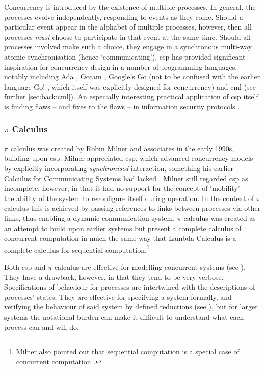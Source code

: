 Concurrency is introduced by the existence of multiple processes.  In general, the processes evolve independently, responding to events as they come.  Should a particular event appear in the alphabet of multiple processes, however, then all processes \emph{must} choose to participate in that event at the same time.  Should all processes involved make such a choice, they engage in a synchronous multi-way atomic synchronisation (hence `communicating').  \gls{csp} has provided significant inspiration for concurrency design in a number of programming languages, notably including Ada \cite{Defense1983,Taft2013}, Occam \cite{Elizabeth1987}, Google's Go \cite{Meyerson2014} (not to be confused with the earlier language Go! \cite{Clark2004}, which itself was explicitly designed for concurrency) and \gls{cml} \cite{Reppy2011} (see further \vref{sec:back:cml}).  An especially interesting practical application of \gls{csp} itself is finding flaws -- and fixes to the flaws -- in information security protocols \cite{Roscoe1995,Lowe1996,Koltuksuz2010}.

\subsubsection{\(\pi\) Calculus}
\(\pi\) calculus was created by Robin Milner and associates in the early 1990s, building upon \gls{csp}.  Milner appreciated \gls{csp}, which advanced concurrency models by explicitly incorporating \emph{synchronised} interaction, something his earlier Calculus for Communicating Systems \cite{Milner1980} had lacked  \cite{Milner1993}.  Milner still regarded \gls{csp} as incomplete, however, in that it had no support for the concept of `mobility' --- \ie{} the ability of the system to reconfigure itself during operation.  In the context of \(\pi\) calculus this is achieved by passing references to links between processes via other links, thus enabling a dynamic communication system. \(\pi\) calculus was created as an attempt to build upon earlier systems but present a complete calculus of concurrent computation in much the same way that Lambda Calculus \cite{Barendregt1984} is a complete calculus for sequential computation.\footnote{Milner also pointed out that sequential computation is a special case of concurrent computation \cite{Milner1993}.}

Both \gls{csp} and \(\pi\) calculus are effective for modelling concurrent systems (see \eg{} \cite{Roscoe2011}).  They have a drawback, however, in that they tend to be very verbose.  Specifications of behaviour for processes are intertwined with the descriptions of processes' states.  They are effective for specifying a system formally, and verifying the behaviour of said system by defined reductions (see \eg{} \cite[Ch.~3.2]{Varela2013}), but for larger systems the notational burden can make it difficult to understand what each process can and will do.

